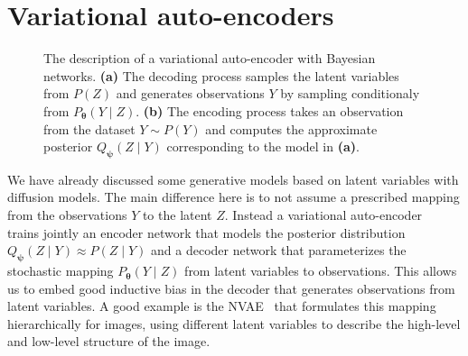 \section{Variational auto-encoders}
\begin{figure*}
    \centering
    \begin{subfigure}{.45\textwidth}
  \centering
  \caption{}
  \label{}
\end{subfigure}
\begin{subfigure}{.45\textwidth}
\centering
{}
\caption{}
\label{}
\end{subfigure}
\caption{The description of a variational auto-encoder with Bayesian networks. \textbf{(a)} The decoding process samples the latent variables from $P(Z)$ and generates observations $Y$ by sampling conditionaly from $P_{\mathbf{\theta}}(Y\mid Z)$. \textbf{(b)} The encoding process takes an observation from the dataset $Y \sim P(Y)$ and computes the approximate posterior $Q_{\bm \psi}(Z\mid Y)$ corresponding to the model in \textbf{(a)}.}
\end{figure*}

We have already discussed some generative models based on latent variables with diffusion models. The main difference here is to not assume a prescribed mapping from the observations $Y$ to the latent $Z$. Instead a variational auto-encoder~\citep[VAE, ][]{kingma_auto-encoding_2013} trains jointly an encoder network that models the posterior distribution $Q_{\bm \psi}(Z\mid Y) \approx P(Z\mid Y) $ and a decoder network that parameterizes the stochastic mapping $P_{\bm \theta}(Y\mid Z)$ from latent variables to observations. This allows us to embed good inductive bias in the decoder that generates observations from latent variables. A good example is the NVAE~\citep{vahdat_nvae_2020} that formulates this mapping hierarchically for images, using different latent variables to describe the high-level and low-level structure of the image.

